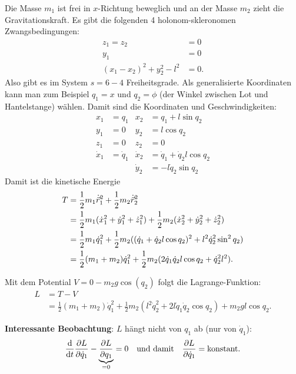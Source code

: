 \begin{beispiel*}
	Die Masse $m_1$ ist frei in $x$-Richtung beweglich und an der Masse $m_2$ zieht die Gravitationskraft.
	Es gibt die folgenden 4 holonom-skleronomen Zwangsbedingungen:
	\begin{align*}
	z_1 = z_2 &= 0\\
	y_1 &= 0\\
	(x_1 - x_2)^2 + y_2^2 - l^2 &= 0
	\text{.}
	\end{align*}
	Also gibt es im System $s = 6 - 4$ Freiheitsgrade.
	Als generalisierte Koordinaten kann man zum Beispiel $q_1 = x$ und $q_2 = \phi$ (der Winkel zwischen Lot und Hantelstange) wählen. Damit sind die Koordinaten und Geschwindigkeiten:
	\begin{align*}
	x_1 &= q_1 & x_2 &= q_1 + l \sin q_2\\
	y_1 &= 0 & y_2 &= l \cos q_2\\
	z_1 &= 0 & z_2 &= 0\\
	\dot{x}_1 &= \dot{q}_1 & \dot{x}_2 &= \dot{q}_1 + \dot{q}_2 l \cos q_2\\
	&&\dot{y}_2 &= - l \dot{q}_2 \sin q_2
	\end{align*}
	Damit ist die kinetische Energie
	\begin{align*}
	T & = \frac12 m_1 \dot{\vec{r}}^2_1 + \frac12 m_2 \dot{\vec{r}}^2_2 \\
	&= \frac12 m_1 (\dot{x}_1^2 + \dot{y}_1^2 + \dot{z}_1^2) + \frac12 m_2 (\dot{x}_2^2 + \dot{y}_2^2 + \dot{z}_2^2) \\
	&= \frac12 m_1 \dot{q}_1^2 + \frac12 m_2 ( (\dot{q}_1 + \dot{q}_2 l \cos q_2)^2 + l^2 \dot{q}_2^2 \sin^2 q_2) \\
	&= \frac12 (m_1 + m_2) \dot{q}_1^2 + \frac12 m_2 (2 \dot{q}_1 \dot{q}_2 l \cos q_2 + \dot{q}_2^2 l^2) 
	\text{.}
	\end{align*}
	
	Mit dem Potential $V = 0 - m_2 g \cos(q_2)$ folgt die Lagrange-Funktion:
	\begin{align*}
		L &= T - V \\
		&= \frac12 (m_1 + m_2) \dot{q}_1^2 + \frac12 m_2 (l^2 \dot{q}_2^2 + 2 l \dot{q}_1 \dot{q}_2 \cos q_2) + m_2 g l \cos q_2
		\text{.}
	\end{align*}
	
	\textbf{Interessante Beobachtung}: $L$ hängt nicht von $q_1$ ab (nur von $\dot{q}_1$):
	\[
		\frac{\mathrm d}{\mathrm d t} \frac{\partial L}{\partial \dot{q}_1} - \underbrace{\frac{\partial L}{\partial q_1}}_{= 0} = 0
		\quad \text{und damit} \quad 	
		\frac{\partial L}{\partial \dot{q}_1} = \text{konstant}
		\text{.}
	\]
\end{beispiel*}

